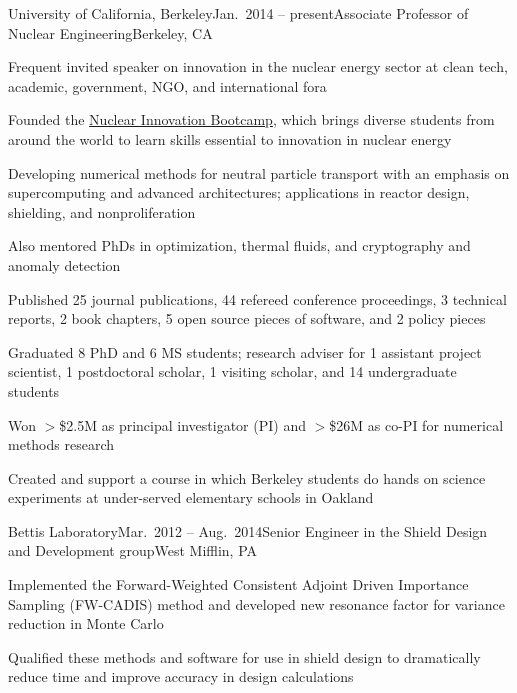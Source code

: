 \begin{rSubsection}{University of California, Berkeley}{Jan.\ 2014 -- present}{Associate Professor of Nuclear Engineering}{Berkeley, CA}
\item Frequent invited speaker on innovation in the nuclear energy sector at clean tech, academic, government, NGO, and international fora
\item Founded the \href{https://www.nuclearinnovationbootcamp.org/}{Nuclear Innovation Bootcamp}, which brings diverse students from around the world to learn skills essential to innovation in nuclear energy 
\item Developing numerical methods for neutral particle transport with an emphasis on supercomputing and advanced architectures; applications in reactor design, shielding, and nonproliferation
\item Also mentored PhDs in optimization, thermal fluids, and cryptography and anomaly detection 
\item Published 25 journal publications, 44 refereed conference proceedings, 3 technical reports, 2 book chapters, 5 open source pieces of software, and 2 policy pieces
\item Graduated 8 PhD and 6 MS students; research adviser for 1 assistant project scientist, 1 postdoctoral scholar, 1 visiting scholar, and 14 undergraduate students
\item Won $>$\$2.5M as principal investigator (PI) and $>$\$26M as co-PI for numerical methods research
\item Created and support a course in which Berkeley students do hands on science experiments at under-served elementary schools in Oakland
\end{rSubsection}


\clearpage
\begin{rSubsection}{Bettis Laboratory}{Mar.\ 2012 -- Aug.\ 2014}{Senior Engineer in the Shield Design and Development group}{West Mifflin, PA}
\item Implemented the Forward-Weighted Consistent Adjoint Driven Importance Sampling (FW-CADIS) method and developed new resonance factor for variance reduction in Monte Carlo
\item Qualified these methods and software for use in shield design to dramatically reduce time and improve accuracy in design calculations
\end{rSubsection}

